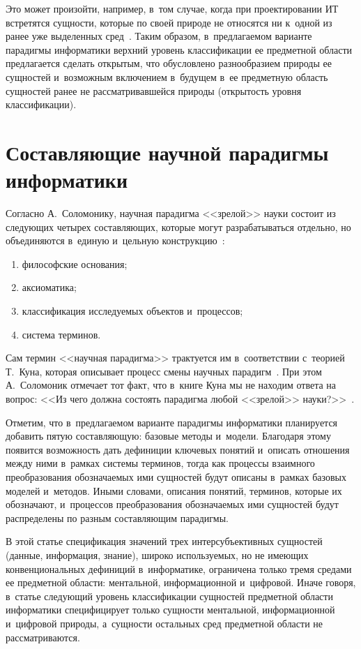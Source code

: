 \begin{multicols}{2}
  Это может произойти, например, в~том случае, когда при проектировании ИТ 
встретятся сущности, которые по своей природе не относятся ни к~одной из 
ранее уже выделенных сред~\cite{32-zac}. Таким образом, в~предлагаемом 
варианте парадигмы информатики верхний уровень классификации ее 
пред\-мет\-ной об\-ласти предлагается сделать открытым, что обусловлено 
разнообразием природы ее сущностей и~возможным включением в~будущем 
в~ее предметную об\-ласть сущностей ранее не рас\-смат\-ри\-вав\-шей\-ся природы 
(откры\-тость уров\-ня классификации).

\section{Составляющие научной парадигмы информатики}

  Согласно А.~Соломонику, научная парадигма <<зрелой>> науки состоит из 
следующих четырех составляющих, которые могут разрабатываться отдельно, 
но объединяются в~единую и~цель\-ную конструкцию~\cite[с.~23--24]{33-zac}:
  \begin{enumerate}[(1)]
\item философские основания;
  \item аксиоматика;
  \item классификация исследуемых объектов и~процессов;
  \item система терминов.
  \end{enumerate}
  
  Сам термин <<научная парадигма>> трактуется им в~соответствии с~тео\-ри\-ей 
Т.~Куна, которая описывает процесс смены научных парадигм~\cite{34-zac}. 
При этом А.~Соломоник отмечает тот факт, что в~книге Куна мы не находим 
ответа на вопрос: <<Из чего должна состоять парадигма любой <<зрелой>> 
науки?>>~\cite[с.~23]{33-zac}.
  
  Отметим, что в~предлагаемом варианте парадигмы информатики планируется 
добавить пятую составляющую: базовые методы и~модели. Благодаря этому 
появится возможность дать дефиниции ключевых понятий и~описать 
отношения между ними в~рамках системы терминов, тогда как процессы 
взаимного преобразования обозначаемых ими сущностей будут описаны 
в~рамках базовых моделей и~методов. Иными словами, описания понятий, 
терминов, которые их обозначают, и~процессов преобразования обозна\-ча\-емых 
ими сущностей будут распределены по разным составляющим па\-ра\-дигмы.
{

}
  
  В этой статье спецификация значений трех интер\-субъ\-ек\-тив\-ных сущностей 
(данные, информация, знание), широко используемых, но не \mbox{име\-ющих} 
конвенциональных дефиниций в~информатике, ограничена только тремя 
средами ее предметной об\-ласти: ментальной, информационной и~циф\-ро\-вой. 
Иначе говоря, в~статье следующий уровень классификации сущностей 
предметной об\-ласти информатики специфицирует только сущности 
ментальной, информационной и~циф\-ро\-вой природы, а~сущности остальных 
сред предметной об\-ласти не рас\-смат\-ри\-ва\-ются.


\end{multicols}
